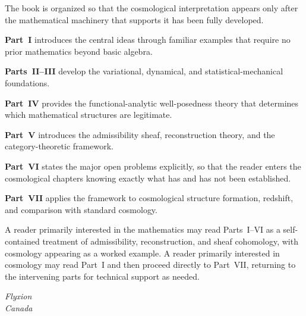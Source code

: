 The book is organized so that the cosmological interpretation
appears only after the mathematical machinery that supports it has
been fully developed.

\textbf{Part~I} introduces the central ideas through familiar
examples that require no prior mathematics beyond basic algebra.

\textbf{Parts~II--III} develop the variational, dynamical, and
statistical-mechanical foundations.

\textbf{Part~IV} provides the functional-analytic well-posedness
theory that determines which mathematical structures are legitimate.

\textbf{Part~V} introduces the admissibility sheaf, reconstruction
theory, and the category-theoretic framework.

\textbf{Part~VI} states the major open problems explicitly, so that
the reader enters the cosmological chapters knowing exactly what has
and has not been established.

\textbf{Part~VII} applies the framework to cosmological structure
formation, redshift, and comparison with standard cosmology.

A reader primarily interested in the mathematics may read Parts~I--VI
as a self-contained treatment of admissibility, reconstruction, and
sheaf cohomology, with cosmology appearing as a worked example.
A reader primarily interested in cosmology may read Part~I and then
proceed directly to Part~VII, returning to the intervening parts for
technical support as needed.

\bigskip
\begin{flushright}
\itshape
Flyxion\\
Canada
\end{flushright}
